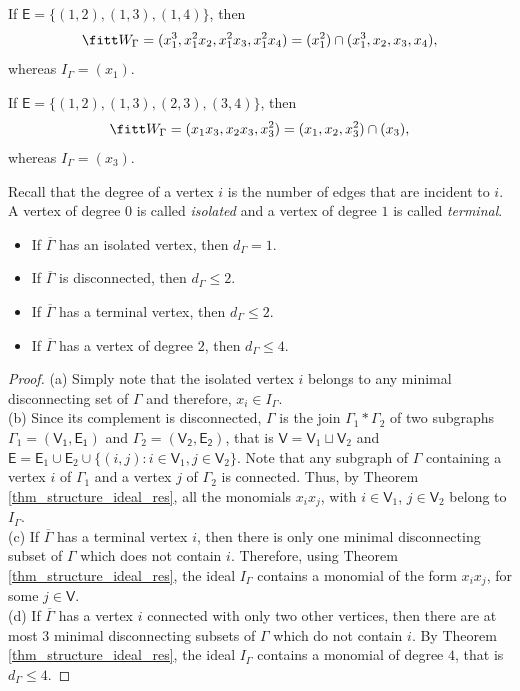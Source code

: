 \documentclass[10pt, leqno]{amsart}
\begin{document}
\begin{exmp} \label{ex:n = 4_tree2}
If $\mathsf{E} = \{(1,2), (1,3), (1,4)\}$, then
\[
\fitt W_\Gamma = (x_1^3, x_1^2x_2, x_1^2x_3, x_1^2x_4) = (x_1^2) \cap (x_1^3, x_2, x_3, x_4),
\]
whereas $I_\Gamma = (x_1)$.    
\end{exmp}

\begin{exmp}
If $\mathsf{E} = \{(1,2), (1,3), (2,3), (3,4)\}$, then
\[
\fitt W_\Gamma = (x_1x_3, x_2x_3, x_3^2) = (x_1, x_2, x_3^2) \cap (x_3),
\]
whereas $I_\Gamma = (x_3)$.
\end{exmp}

Recall that the degree of a vertex $i$ is the number of edges that are incident to $i$. A vertex of degree 0 is called \emph{isolated} and a vertex of degree $1$ is called \emph{terminal}.

\begin{lem} \label{lem_obs}
\hfill
\begin{itemize}
    \item [(a)] If $\overline{\Gamma}$ has an isolated vertex, then $d_\Gamma = 1$.
    \item [(b)] If $\overline{\Gamma}$ is disconnected, then $d_\Gamma \le 2$.
    \item [(c)] If $\overline{\Gamma}$ has a terminal vertex, then $d_\Gamma \le 2$.
    \item [(d)] If $\overline{\Gamma}$ has a vertex of degree $2$, then $d_\Gamma \le 4$.
\end{itemize}
\end{lem}

\begin{proof}
(a) Simply note that the isolated vertex $i$ belongs to any minimal disconnecting set of $\Gamma$ and therefore, $x_i \in I_\Gamma$.\\
(b) Since its complement is disconnected, $\Gamma$ is the join $\Gamma_1 * \Gamma_2$ of two subgraphs $\Gamma_1 = (\mathsf{V_1}, \mathsf{E_1})$ and $\Gamma_2 = (\mathsf{V_2}, \mathsf{E_2})$, that is $\mathsf{V} = \mathsf{V}_1 \sqcup \mathsf{V}_2$ and $\mathsf{E} = \mathsf{E}_1 \cup \mathsf{E}_2 \cup \{(i,j) : i \in \mathsf{V}_1, j \in \mathsf{V}_2\}$. Note that any subgraph of $\Gamma$ containing a vertex $i$ of $\Gamma_1$ and a vertex $j$ of $\Gamma_2$ is connected. Thus, by Theorem \ref{thm_structure_ideal_res}, all the monomials $x_i x_j$, with $i \in \mathsf{V}_1$, $j \in \mathsf{V}_2$ belong to $I_\Gamma$.\\
(c) If $\overline{\Gamma}$ has a terminal vertex $i$, then there is only one minimal disconnecting subset of $\Gamma$ which does not contain $i$. Therefore, using Theorem \ref{thm_structure_ideal_res}, the ideal $I_\Gamma$ contains a monomial of the form $x_i x_j$, for some $j\in \mathsf{V}$.\\
(d) If $\overline{\Gamma}$ has a vertex $i$ connected with only two other vertices, then there are at most $3$ minimal disconnecting subsets of $\Gamma$ which do not contain $i$. By Theorem \ref{thm_structure_ideal_res}, the ideal $I_\Gamma$ contains a monomial of degree $4$, that is $d_\Gamma \le 4$.
\end{proof}
\end{document}
